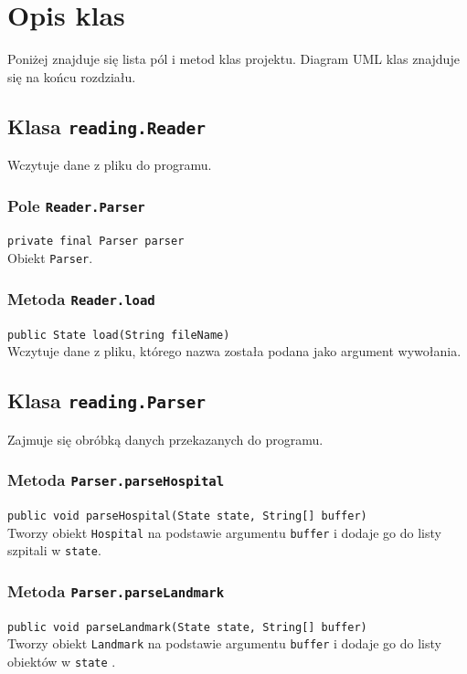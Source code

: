 \documentclass{article}
\begin{document}
\label{gui_start_stop}

\pagebreak
\section{Opis klas}

Poniżej znajduje się lista pól i metod klas projektu. Diagram UML klas znajduje się na końcu rozdziału.

\subsection{Klasa \texttt{reading.Reader}}
Wczytuje dane z pliku do programu.

\subsubsection{Pole \texttt{Reader.Parser}}
\texttt{private final Parser parser} \\
Obiekt \texttt{Parser}.

\subsubsection{Metoda \texttt{Reader.load}}
\texttt{public State load(String fileName)} \\
Wczytuje dane z pliku, którego nazwa została podana jako argument wywołania.

\subsection{Klasa \texttt{reading.Parser}}
Zajmuje się obróbką danych przekazanych do programu.

\subsubsection{Metoda \texttt{Parser.parseHospital}}
\texttt{public void parseHospital(State state, String[] buffer)} \\
Tworzy obiekt \texttt{Hospital} na podstawie argumentu \texttt{buffer} i dodaje go do listy szpitali w \texttt{state}.

\subsubsection{Metoda \texttt{Parser.parseLandmark}}
\texttt{public void parseLandmark(State state, String[] buffer)} \\
Tworzy obiekt \texttt{Landmark} na podstawie argumentu \texttt{buffer} i dodaje go do listy obiektów w \texttt{state} .
\end{document}
